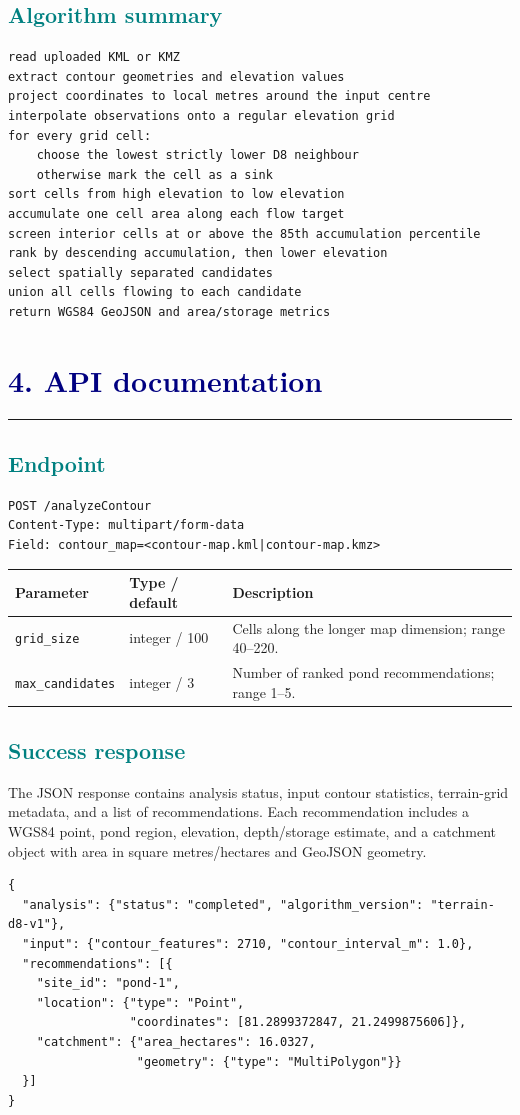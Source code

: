 \documentclass[11pt,a4paper]{article}
\newcommand{\sectionrule}{\textcolor{teal}{\rule{\linewidth}{1.2pt}}}
\newcommand{\reportsection}[1]{\section*{\textcolor{navy}{#1}}\sectionrule\vspace{4pt}}
\newcommand{\reportsubsection}[1]{\subsection*{\textcolor{teal}{#1}}}
\newcommand{\code}[1]{\texttt{#1}}
\begin{document}
\reportsubsection{Algorithm summary}
\begin{lstlisting}
read uploaded KML or KMZ
extract contour geometries and elevation values
project coordinates to local metres around the input centre
interpolate observations onto a regular elevation grid
for every grid cell:
    choose the lowest strictly lower D8 neighbour
    otherwise mark the cell as a sink
sort cells from high elevation to low elevation
accumulate one cell area along each flow target
screen interior cells at or above the 85th accumulation percentile
rank by descending accumulation, then lower elevation
select spatially separated candidates
union all cells flowing to each candidate
return WGS84 GeoJSON and area/storage metrics
\end{lstlisting}

\reportsection{4. API documentation}
\reportsubsection{Endpoint}
\begin{lstlisting}
POST /analyzeContour
Content-Type: multipart/form-data
Field: contour_map=<contour-map.kml|contour-map.kmz>
\end{lstlisting}

\begin{tabularx}{\linewidth}{@{}p{28mm}p{32mm}X@{}}
\toprule
\textbf{Parameter} & \textbf{Type / default} & \textbf{Description}\\
\midrule
\code{grid\_size} & integer / 100 & Cells along the longer map dimension; range 40--220.\\
\code{max\_candidates} & integer / 3 & Number of ranked pond recommendations; range 1--5.\\
\bottomrule
\end{tabularx}

\reportsubsection{Success response}
The JSON response contains analysis status, input contour statistics, terrain-grid metadata, and a list of recommendations. Each recommendation includes a WGS84 point, pond region, elevation, depth/storage estimate, and a catchment object with area in square metres/hectares and GeoJSON geometry.

\begin{lstlisting}
{
  "analysis": {"status": "completed", "algorithm_version": "terrain-d8-v1"},
  "input": {"contour_features": 2710, "contour_interval_m": 1.0},
  "recommendations": [{
    "site_id": "pond-1",
    "location": {"type": "Point",
                 "coordinates": [81.2899372847, 21.2499875606]},
    "catchment": {"area_hectares": 16.0327,
                  "geometry": {"type": "MultiPolygon"}}
  }]
}
\end{lstlisting}
\end{document}
